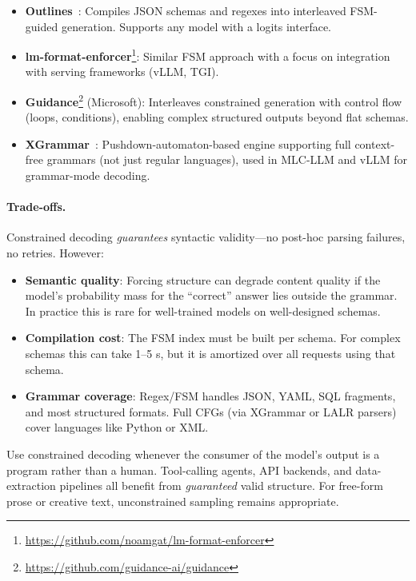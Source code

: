 \begin{itemize}
  \item \textbf{Outlines}~\cite{willard2023outlines}: Compiles JSON schemas and regexes into interleaved FSM-guided generation. Supports any model with a logits interface.
  \item \textbf{lm-format-enforcer}\footnote{\url{https://github.com/noamgat/lm-format-enforcer}}: Similar FSM approach with a focus on integration with serving frameworks (vLLM, TGI).
  \item \textbf{Guidance}\footnote{\url{https://github.com/guidance-ai/guidance}} (Microsoft): Interleaves constrained generation with control flow (loops, conditions), enabling complex structured outputs beyond flat schemas.
  \item \textbf{XGrammar}~\cite{dong2024xgrammar}: Pushdown-automaton-based engine supporting full context-free grammars (not just regular languages), used in MLC-LLM and vLLM for grammar-mode decoding.
\end{itemize}

\paragraph{Trade-offs.}
\label{trade-offs.}

Constrained decoding \emph{guarantees} syntactic validity---no post-hoc parsing failures, no retries. However:

\begin{itemize}
  \item \textbf{Semantic quality}: Forcing structure can degrade content quality if the model’s probability mass for the ``correct'' answer lies outside the grammar. In practice this is rare for well-trained models on well-designed schemas.
  \item \textbf{Compilation cost}: The FSM index must be built per schema. For complex schemas this can take 1--5 s, but it is amortized over all requests using that schema.
  \item \textbf{Grammar coverage}: Regex/FSM handles JSON, YAML, SQL fragments, and most structured formats. Full CFGs (via XGrammar or LALR parsers) cover languages like Python or XML.
\end{itemize}

\begin{keybox}
Use constrained decoding whenever the consumer of the model’s output is a program rather than a human. Tool-calling agents, API backends, and data-extraction pipelines all benefit from \emph{guaranteed} valid structure. For free-form prose or creative text, unconstrained sampling remains appropriate.
\end{keybox}

